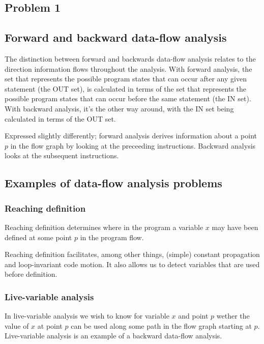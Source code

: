 \documentclass[twoside]{article}
\begin{document}
\begin{multicols}{2} %

    \section{Problem 1}

    \subsection{Forward and backward data-flow analysis}

    The distinction between forward and backwards data-flow analysis relates to the direction information flows throughout the analysis.
    With forward analysis, the set that represents the possible program states that can occur after any given statement (the OUT set), is calculated in terms of the set that represents the possible program states that can occur before the same statement (the IN set).
    With backward analysis, it's the other way around, with the IN set being calculated in terms of the OUT set.

    Expressed slightly differently; forward analysis derives information about a point $p$ in the flow graph by looking at the preceeding instructions. Backward analysis looks at the subsequent instructions.

 
    \subsection{Examples of data-flow analysis problems}

    \subsubsection{Reaching definition}

    Reaching definition determines where in the program a variable $x$ may have been defined at some point $p$ in the program flow.

    Reaching definition facilitates, among other things, (simple) constant propagation and loop-invariant code motion.
    It also allows us to detect variables that are used before definition.

    \subsubsection{Live-variable analysis}

    In live-variable analysis we wish to know for variable $x$ and point $p$ wether the value of $x$ at point $p$ can be used along some path in the flow graph starting at $p$.
    Live-variable analysis is an example of a backward data-flow analysis.


\end{multicols}
\end{document}
